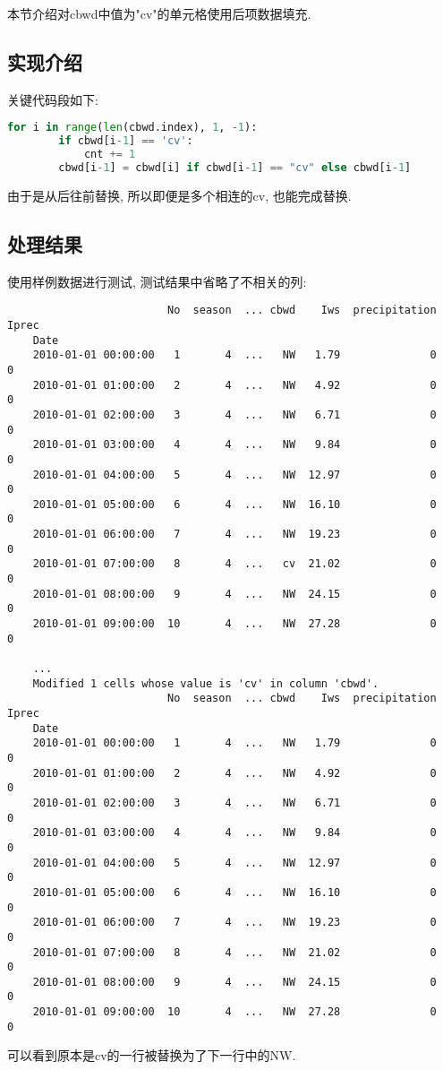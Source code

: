 本节介绍对cbwd中值为"cv"的单元格使用后项数据填充.

\subsection{实现介绍}
关键代码段如下:
\begin{lstlisting}[language=Python]
    for i in range(len(cbwd.index), 1, -1):
        if cbwd[i-1] == 'cv':
            cnt += 1
        cbwd[i-1] = cbwd[i] if cbwd[i-1] == "cv" else cbwd[i-1]
\end{lstlisting}
由于是从后往前替换, 所以即便是多个相连的cv, 也能完成替换.

\subsection{处理结果}
使用样例数据进行测试, 测试结果中省略了不相关的列:
\begin{lstlisting}
                         No  season  ... cbwd    Iws  precipitation  Iprec
    Date
    2010-01-01 00:00:00   1       4  ...   NW   1.79              0      0
    2010-01-01 01:00:00   2       4  ...   NW   4.92              0      0
    2010-01-01 02:00:00   3       4  ...   NW   6.71              0      0
    2010-01-01 03:00:00   4       4  ...   NW   9.84              0      0
    2010-01-01 04:00:00   5       4  ...   NW  12.97              0      0
    2010-01-01 05:00:00   6       4  ...   NW  16.10              0      0
    2010-01-01 06:00:00   7       4  ...   NW  19.23              0      0
    2010-01-01 07:00:00   8       4  ...   cv  21.02              0      0
    2010-01-01 08:00:00   9       4  ...   NW  24.15              0      0
    2010-01-01 09:00:00  10       4  ...   NW  27.28              0      0
    
    ...
    Modified 1 cells whose value is 'cv' in column 'cbwd'.
                         No  season  ... cbwd    Iws  precipitation  Iprec
    Date
    2010-01-01 00:00:00   1       4  ...   NW   1.79              0      0
    2010-01-01 01:00:00   2       4  ...   NW   4.92              0      0
    2010-01-01 02:00:00   3       4  ...   NW   6.71              0      0
    2010-01-01 03:00:00   4       4  ...   NW   9.84              0      0
    2010-01-01 04:00:00   5       4  ...   NW  12.97              0      0
    2010-01-01 05:00:00   6       4  ...   NW  16.10              0      0
    2010-01-01 06:00:00   7       4  ...   NW  19.23              0      0
    2010-01-01 07:00:00   8       4  ...   NW  21.02              0      0
    2010-01-01 08:00:00   9       4  ...   NW  24.15              0      0
    2010-01-01 09:00:00  10       4  ...   NW  27.28              0      0
\end{lstlisting}
可以看到原本是cv的一行被替换为了下一行中的NW.